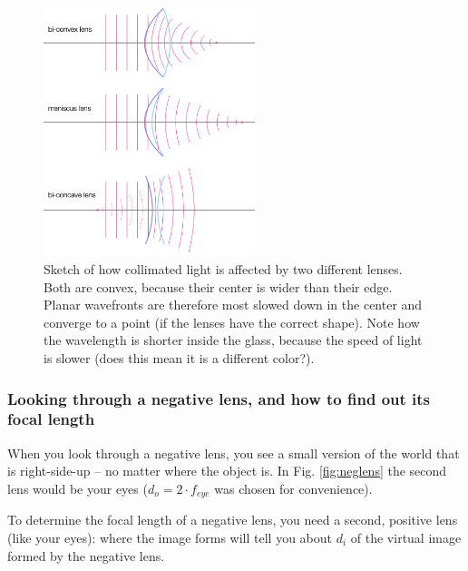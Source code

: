 \documentclass[a4paper]{report}
\begin{document}
	\begin{figure}[h]
		\center
		\includegraphics[width=0.55\textwidth]{figures/lens_wave_picture.png}
		\captionsetup{width=0.6\textwidth}
		\caption{Sketch of how collimated light is affected by two different lenses. Both are convex, because their center is wider than their edge. Planar wavefronts are therefore most slowed down in the center and converge to a point (if the lenses have the correct shape). Note how the wavelength is shorter inside the glass, because the speed of light is slower (does this mean it is a different color?).}
		\label{fig:lens_wave}
	\end{figure}


	\subsubsection{Looking through a negative lens, and how to find out its focal length}
	When you look through a negative lens, you see a small version of the world that is right-side-up -- no matter where the object is. In Fig. \ref{fig:neglens} the second lens would be your eyes ($d_o = 2\cdot f_{eye}$ was chosen for convenience).


	To determine the focal length of a negative lens, you need a second, positive lens (like your eyes): where the image forms will tell you about $d_i$ of the virtual image formed by the negative lens.
\end{document}
